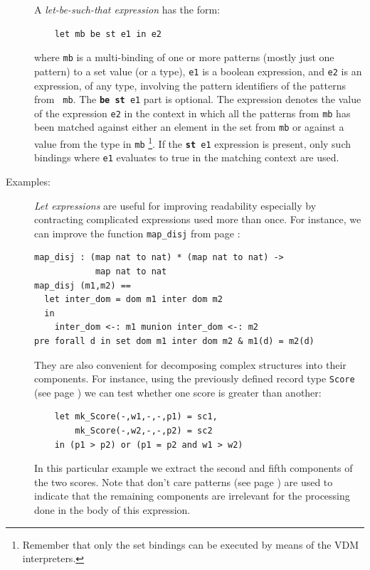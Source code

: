 \documentclass{overturerepchap}
\newcommand{\keyw}[1]{{\bf\ttfamily #1}}
\begin{document}
\begin{description}
  A {\it let-be-such-that expression} has the form:
  \begin{lstlisting}
    let mb be st e1 in e2
  \end{lstlisting}%
  where {\tt mb} is a multi-binding of one or more patterns (mostly
  just one pattern)
 to a set value (or a type),
  {\tt e1} is a boolean expression, and {\tt e2} is an expression, of
  any type, involving the pattern identifiers of the patterns from {\tt
    mb}. The {\tt \keyw{be st} e1} part is optional. The expression
  denotes the value of the expression {\tt e2} in the context in which
  all the patterns from {\tt mb} has been matched against either an element
  in the set from {\tt mb} or against a value from the type in {\tt mb}%
  \footnote{Remember that only the set bindings can be executed by
    means of the VDM interpreters.}.
  If the {\tt \keyw{st} e1} expression is present, only such bindings
  where {\tt e1} evaluates to true in the matching context are used.

\item[Examples:] {\it Let expressions} are useful for improving
  readability especially by contracting complicated expressions used
  more than once. For instance, we can improve the function
  \texttt{map\_disj} from page \pageref{mapdisj}:
\begin{lstlisting}
map_disj : (map nat to nat) * (map nat to nat) -> 
            map nat to nat
map_disj (m1,m2) ==
  let inter_dom = dom m1 inter dom m2
  in
    inter_dom <-: m1 munion inter_dom <-: m2
pre forall d in set dom m1 inter dom m2 & m1(d) = m2(d)
\end{lstlisting}
  They are also convenient for decomposing complex
  structures into their components. For instance, using the previously
  defined record type \texttt{Score} (see page \pageref{scoredef}) we can
  test whether one score is greater than another:
  \begin{lstlisting}
    let mk_Score(-,w1,-,-,p1) = sc1,
        mk_Score(-,w2,-,-,p2) = sc2
    in (p1 > p2) or (p1 = p2 and w1 > w2)
  \end{lstlisting}
  In this
  particular example we extract the second and fifth components of the
  two scores. Note that don't care
  patterns (see page \pageref{patterns}) are used to indicate that the
  remaining components are irrelevant 
  for the processing done in the body of this expression.
  

\end{description}
\end{document}
